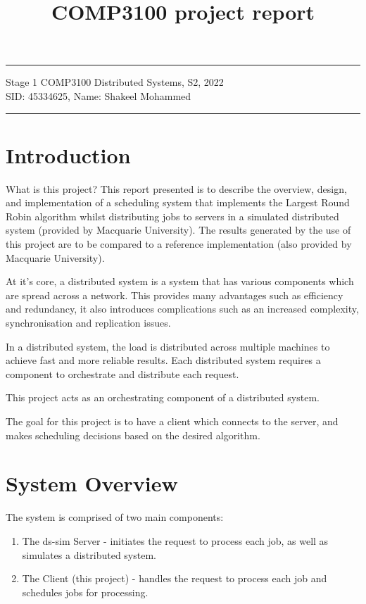 \documentclass[a4paper]{article}
\begin{document}
\title{COMP3100 project report}
\hrule \medskip
\begin{minipage}{0.9\textwidth}
\centering 
\large
Stage 1 COMP3100 Distributed Systems, S2, 2022\\
\normalsize
SID: 45334625, Name: Shakeel Mohammed
\end{minipage}
\medskip\hrule
\bigskip

\section{Introduction}
What is this project?
This report presented is to describe the overview, design, and implementation of a scheduling system that implements the Largest Round Robin algorithm whilst distributing jobs to servers in a simulated distributed system (provided by Macquarie University). The results generated by the use of this project are to be compared to a reference implementation (also provided by Macquarie University).

At it's core, a distributed system is a system that has various components which are spread across a network. This provides many advantages such as efficiency and redundancy, it also introduces complications such as an increased complexity, synchronisation and replication issues.

In a distributed system, the load is distributed across multiple machines to achieve fast and more reliable results. Each distributed system requires a component to orchestrate and distribute each request.

This project acts as an orchestrating component of a distributed system.

The goal for this project is to have a client which connects to the server, and makes scheduling decisions based on the desired algorithm.

\section{System Overview}
\label{sec:section2}
The system is comprised of two main components:
\begin{enumerate}
  \item The ds-sim Server - initiates the request to process each job, as well as simulates a distributed system.
  \item The Client (this project) - handles the request to process each job and schedules jobs for processing.
\end{enumerate}
\end{document}
